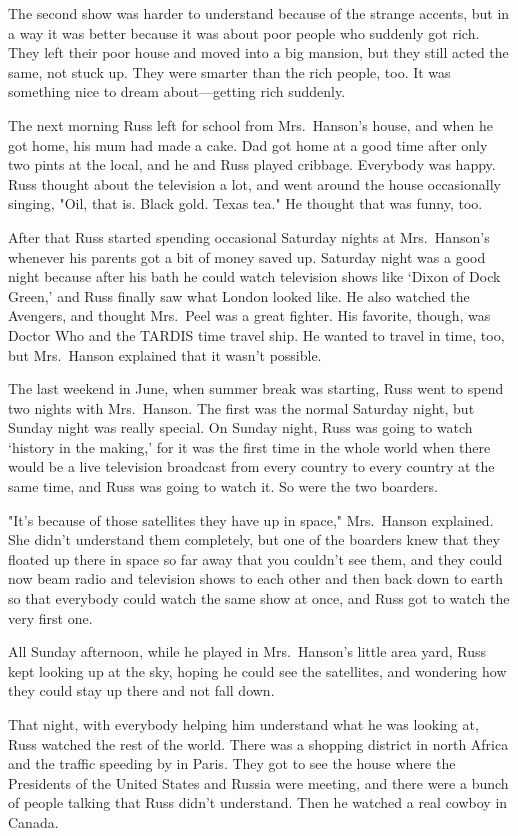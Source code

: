The second show was harder to understand because of the strange accents, but in a way it was better because it was about poor people who suddenly got rich. They left their poor house and moved into a big mansion, but they still acted the same, not stuck up. They were smarter than the rich people, too. It was something nice to dream about—getting rich suddenly.

The next morning Russ left for school from Mrs.~Hanson's house, and when he got home, his mum had made a cake. Dad got home at a good time after only two pints at the local, and he and Russ played cribbage. Everybody was happy. Russ thought about the television a lot, and went around the house occasionally singing, "Oil, that is. Black gold. Texas tea." He thought that was funny, too.

After that Russ started spending occasional Saturday nights at Mrs.~Hanson's whenever his parents got a bit of money saved up. Saturday night was a good night because after his bath he could watch television shows like `Dixon of Dock Green,' and Russ finally saw what London looked like. He also watched the Avengers, and thought Mrs.~Peel was a great fighter. His favorite, though, was Doctor Who and the TARDIS time travel ship. He wanted to travel in time, too, but Mrs.~Hanson explained that it wasn't possible.

The last weekend in June, when summer break was starting, Russ went to spend two nights with Mrs.~Hanson. The first was the normal Saturday night, but Sunday night was really special. On Sunday night, Russ was going to watch `history in the making,' for it was the first time in the whole world when there would be a live television broadcast from every country to every country at the same time, and Russ was going to watch it. So were the two boarders.

"It's because of those satellites they have up in space," Mrs.~Hanson explained. She didn't understand them completely, but one of the boarders knew that they floated up there in space so far away that you couldn't see them, and they could now beam radio and television shows to each other and then back down to earth so that everybody could watch the same show at once, and Russ got to watch the very first one.

All Sunday afternoon, while he played in Mrs.~Hanson's little area yard, Russ kept looking up at the sky, hoping he could see the satellites, and wondering how they could stay up there and not fall down.

That night, with everybody helping him understand what he was looking at, Russ watched the rest of the world. There was a shopping district in north Africa and the traffic speeding by in Paris. They got to see the house where the Presidents of the United States and Russia were meeting, and there were a bunch of people talking that Russ didn't understand. Then he watched a real cowboy in Canada.

